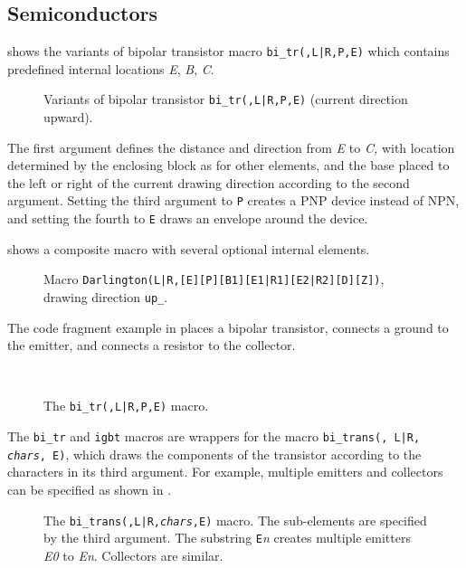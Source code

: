 \pagebreak
\subsection{Semiconductors\label{Semiconductors:}}%
 shows the variants of bipolar transistor macro
{\tt bi\_tr(\linespec,L|R,P,E)}
which contains predefined internal locations {\sl E},
{\sl B}, {\sl C}.
\begin{figure}[H]
   \vspace*{-1ex}
   
   \caption{Variants of bipolar transistor {\tt bi\_tr(\linespec,L|R,P,E)}
    (current direction upward).}
   \label{Bip}
   \end{figure}
The first argument defines the distance and direction from {\sl E}
to {\sl C,} with location determined by the enclosing
block as for other elements, and the base placed
to the left or right of the
current drawing direction according to the second argument.  Setting the third
argument to {\tt P} creates a PNP device instead of NPN, and setting the
fourth to {\tt E} draws an envelope around the device.

 shows a composite macro with several optional internal elements.
\begin{figure}[H]
   
   \caption{Macro {\tt Darlington(L|R,[E][P][B1][E1|R1][E2|R2][D][Z])},
     drawing direction {\tt up\_}.}
   \label{Darlington}
   \end{figure}

\enlargethispage{\baselineskip}
The code fragment example in  places a bipolar transistor,
connects a ground to the emitter, and connects a resistor to the collector.
\begin{figure}[H]
   \quad\quad\parbox{4in}{\small }%
   \quad\raise-0.4in\hbox{ }%
   \vspace{-\baselineskip}
   \caption{The {\tt bi\_tr(\linespec,L|R,P,E)} macro.}
   \label{bitr}
   \end{figure}

The {\tt bi\_tr} and {\tt igbt} macros are wrappers for
the macro {\tt bi\_trans(\linespec, L|R, {\sl chars}, E)}, which
draws the components of the transistor according to the characters in its
third argument.  For example, multiple emitters and collectors can be
specified as shown in .
\begin{figure}[H]
   
   \caption{The {\tt bi\_trans(\linespec,L|R,{\sl chars},E)} macro.
   The sub-elements are specified by the third argument.  The substring
   {\tt E}{\sl n} creates multiple emitters {\sl E0} to {\sl En}.
   Collectors are similar.}
   \label{bitrans}
   \end{figure}

